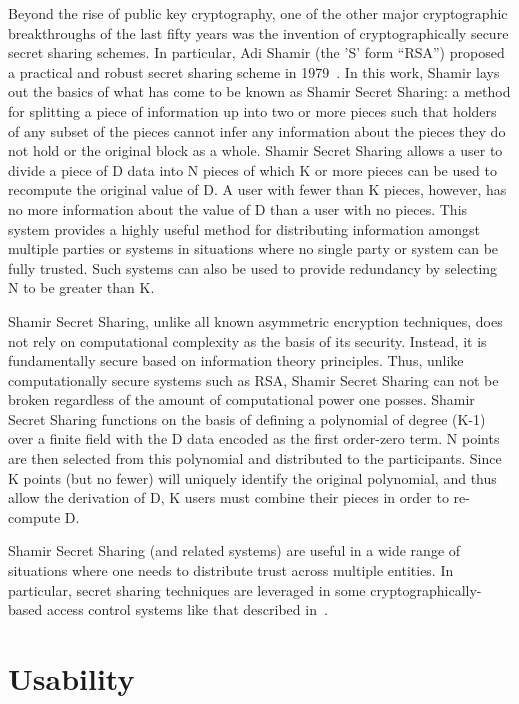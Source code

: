 Beyond the rise of public key cryptography, one of the other major
cryptographic breakthroughs of the last fifty years was the invention
of cryptographically secure secret sharing schemes. In particular, Adi
Shamir (the 'S' form ``RSA'') proposed a practical and robust secret
sharing scheme in 1979~\cite{shamir1979}. In this work, Shamir lays
out the basics of what has come to be known as Shamir Secret Sharing:
a method for splitting a piece of information up into two or more
pieces such that holders of any subset of the pieces cannot infer any
information about the pieces they do not hold or the original block as
a whole. Shamir Secret Sharing allows a user to divide a piece of D
data into N pieces of which K or more pieces can be used to recompute
the original value of D. A user with fewer than K pieces, however, has
no more information about the value of D than a user with no
pieces. This system provides a highly useful method for distributing
information amongst multiple parties or systems in situations where no
single party or system can be fully trusted. Such systems can also be
used to provide redundancy by selecting N to be greater than K.

Shamir Secret Sharing, unlike all known asymmetric encryption
techniques, does not rely on computational complexity as the basis of
its security. Instead, it is fundamentally secure based on information
theory principles. Thus, unlike computationally secure systems such as
RSA, Shamir Secret Sharing can not be broken regardless of the amount
of computational power one posses. Shamir Secret Sharing functions on
the basis of defining a polynomial of degree (K-1) over a finite field
with the D data encoded as the first order-zero term. N points are
then selected from this polynomial and distributed to the
participants. Since K points (but no fewer) will uniquely identify the
original polynomial, and thus allow the derivation of D, K users must
combine their pieces in order to re-compute D.

Shamir Secret Sharing (and related systems) are useful in a wide range
of situations where one needs to distribute trust across multiple
entities. In particular, secret sharing techniques are leveraged in
some cryptographically-based access control systems like that
described in~\cite{goyal2006}.

\section{Usability}
\label{chap:background:usability}

